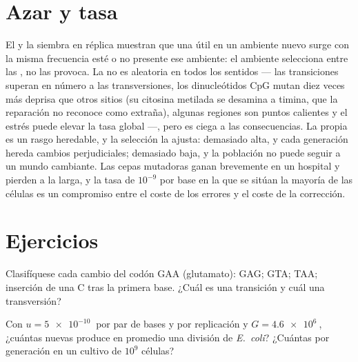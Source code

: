 \section{Azar y tasa}

\begin{proposition}\label{prop:b2:genome-diversification:random}
El  y la siembra en réplica muestran que una 
útil en un ambiente nuevo surge con la misma frecuencia esté o no
presente ese ambiente: el ambiente selecciona entre las , no
las provoca. La  no es aleatoria en todos los sentidos --- las
transiciones superan en número a las transversiones, los dinucleótidos
CpG mutan diez veces más deprisa que otros sitios (su citosina metilada
se desamina a timina, que la reparación no reconoce como extraña),
algunas regiones son puntos calientes y el estrés puede elevar la tasa
global ---, pero es ciega a las consecuencias. La propia  es un rasgo heredable, y la selección la ajusta: demasiado alta,
y cada generación hereda cambios perjudiciales; demasiado baja, y la
población no puede seguir a un mundo cambiante. Las cepas mutadoras
ganan brevemente en un hospital y pierden a la larga, y la tasa de
$10^{-9}$ por base en la que se sitúan la mayoría de las células es un
compromiso entre el coste de los errores y el coste de la corrección.
\end{proposition}

\section{Ejercicios}

\begin{exercise}[$\star$]\label{exo:b2:genome-diversification:1}
Clasifíquese cada cambio del codón GAA (glutamato): GAG; GTA; TAA;
inserción de una C tras la primera base. ¿Cuál es una transición y cuál
una transversión?
\end{exercise}

\begin{exercise}[$\star$]\label{exo:b2:genome-diversification:2}
Con $u = \qty{5e-10}{}$ por par de bases y por replicación y $G =
\qty{4.6e6}{}$, ¿cuántas  nuevas produce en promedio una
división de \emph{E.~coli}? ¿Cuántas por generación en un cultivo de
$10^{9}$ células?
\end{exercise}

